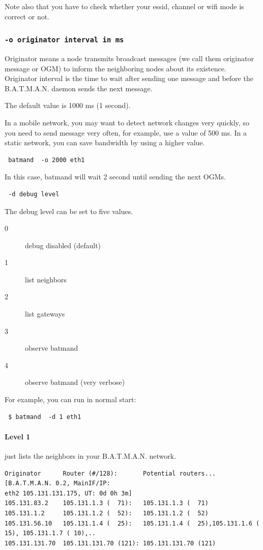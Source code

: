 \documentclass[
	12pt,
	a4paper,
	twoside,
	english,
	headsepline,
	footnosepline,
	automark,
	normalheadings,
	openany,
	cleardoubleplain,
	abstracton,
	idxtotoc,
	liststotoc,
	bibtotoc,
 	BCOR8mm,
]{scrartcl}
\newcommand{\subsubsectionttt}[1]{\subsubsection{\texttt{#1}}}
\begin{document}
Note also that you have to check whether your essid, channel or wifi mode is correct or not.

\subsubsectionttt{-o originator interval in ms}
 Originator means a node transmits broadcast messages (we call them originator message or  OGM) to inform the neighboring nodes about its existence. Originator interval is the time to wait after sending one message and before the B.A.T.M.A.N. daemon sends the next message.

The default value is 1000 ms (1 second).

In a mobile network, you may want to detect network changes very quickly, so you need to  send message very often, for example, use a value of 500 ms. In a static network, you can save bandwidth by using a higher value.
\begin{verbatim} batmand  -o 2000 eth1\end{verbatim}
In this case, batmand will wait 2 second until sending the next OGMs.

\begin{verbatim} -d debug level\end{verbatim}
The debug level can be set to five values.

\begin{description}
 \item[0] debug disabled (default)
 \item[1] list neighbors
 \item[2] list gateways
 \item[3] observe batmand
 \item[4] observe batmand (very verbose)
\end{description}

For example, you can run in normal start:
\begin{verbatim}
 $ batmand  -d 1 eth1
\end{verbatim}

\paragraph*{Level 1}
just lists the neighbors in your B.A.T.M.A.N. network.

\begin{lstlisting}[basicstyle=\footnotesize,	frame=single, columns= flexible]
Originator      Router (#/128):       Potential routers... [B.A.T.M.A.N. 0.2, MainIF/IP:
eth2 105.131.131.175, UT: 0d 0h 3m]
105.131.83.2    105.131.1.3 (  71):   105.131.1.3 (  71)
105.131.1.2     105.131.1.2 (  52):   105.131.1.2 (  52)
105.131.56.10   105.131.1.4 (  25):   105.131.1.4 (  25),105.131.1.6 ( 15), 105.131.1.7 ( 10),..
105.131.131.70  105.131.131.70 (121): 105.131.131.70 (121)
\end{lstlisting}
\end{document}
